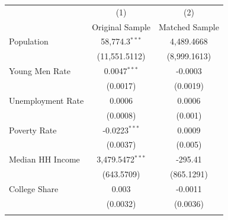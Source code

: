 \begin{tabular}{@{\extracolsep{5pt}} lcc} 
\toprule
\midrule
 & (1) & (2) \\
   & Original Sample  & Matched Sample  \\ 
\midrule

\enspace Population & 58,774.3$^{***}$ & 4,489.4668  \\ 
 & (11,551.5112) & (8,999.1613) \\ 
 \addlinespace

\enspace Young Men Rate & 0.0047$^{***}$ & -0.0003 \\ 
  & (0.0017) & (0.0019) \\ 
 \addlinespace  

\enspace Unemployment Rate & 0.0006 & 0.0006 \\ 
 & (0.0008) & (0.001) \\ 
 \addlinespace

\enspace Poverty Rate & -0.0223$^{***}$ & 0.0009 \\ 
 & (0.0037) & (0.005) \\ 
 \addlinespace

\enspace Median HH Income & 3,479.5472$^{***}$ & -295.41 \\ 
  & (643.5709) & (865.1291) \\ 
 \addlinespace

\enspace College Share & 0.003 & -0.0011 \\ 
  & (0.0032) & (0.0036) \\ 
 \addlinespace
 
\bottomrule 
\end{tabular}

